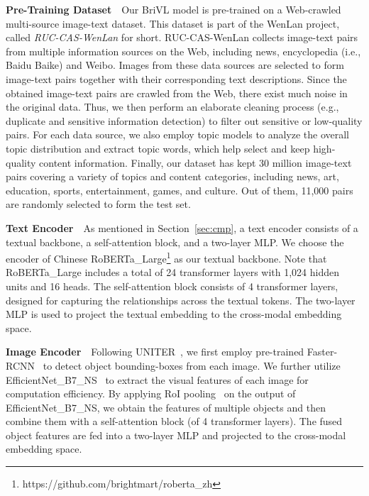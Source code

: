\documentclass[10pt,twocolumn,letterpaper]{article}
\begin{document}
\noindent\textbf{Pre-Training Dataset}~~Our BriVL model is pre-trained on a Web-crawled multi-source image-text dataset. This dataset is part of the WenLan project, called \emph{RUC-CAS-WenLan} for short. RUC-CAS-WenLan collects image-text pairs from multiple information sources on the Web, including news, encyclopedia (i.e., Baidu Baike) and Weibo. Images from these data sources are selected to form image-text pairs together with their corresponding text descriptions. Since the obtained image-text pairs are crawled from the Web, there exist much noise in the original data. Thus, we then perform an elaborate cleaning process (e.g., duplicate and sensitive information detection) to filter out sensitive or low-quality pairs. For each data source, we also employ topic models to analyze the overall topic distribution and extract topic words, which help select and keep high-quality content information. 
Finally, our dataset has kept 30 million image-text pairs covering a variety of topics and content categories, including news, art, education, sports, entertainment, games, and culture. Out of them, 11,000 pairs are randomly selected to form the test set. 

\noindent\textbf{Text Encoder}~~As mentioned in Section~\ref{sec:cmp}, a text encoder consists of a textual backbone, a self-attention block, and a two-layer MLP. We choose the encoder of Chinese RoBERTa\_Large\footnote{https://github.com/brightmart/roberta\_zh} as our textual backbone. Note that RoBERTa\_Large includes a total of 24 transformer layers with 1,024 hidden units and 16 heads. The self-attention block consists of 4 transformer layers, designed for capturing the relationships across the textual tokens. The two-layer MLP is used to project the textual embedding to the cross-modal embedding space.

\noindent\textbf{Image Encoder}~~Following UNITER~\cite{chen2020uniter}, we first employ pre-trained Faster-RCNN~\cite{ren2016faster} to detect object bounding-boxes from each image. We further utilize EfficientNet\_B7\_NS~\cite{tan2019efficientnet, xie2020self} to extract the visual features of each image for computation efficiency. By applying RoI pooling~\cite{girshick2015fast} on the output of EfficientNet\_B7\_NS, we obtain the features of multiple objects and then combine them with a self-attention block (of 4 transformer layers). The fused object features are fed into a two-layer MLP and projected to the cross-modal embedding space.
\end{document}
